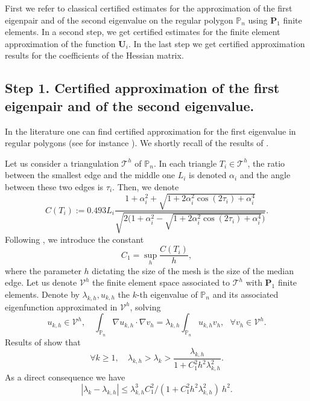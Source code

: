 \documentclass[JEP,XML,SOM,Unicode,ThmDefs,NoFloatCountersInSection,published]{cedram}
\theoremstyle{plain}
\theoremstyle{definition}
\newcommand{\bo}[1]{{\boldsymbol#1}}
\def\Pp{{\mathbb{P}_n}}
\newcommand{\lb}{\lambda}
\begin{document}
First we refer to classical certified estimates for the approximation of the first eigenpair and of the second eigenvalue on the regular polygon $\Pp$ using $\bo P_1$ finite elements. In a second step, we get certified estimates for the finite element approximation of the function $\bo U_i$. In the last step we get certified approximation results for the coefficients of the Hessian matrix.

\subsection{Step 1. Certified approximation of the first eigenpair and of the second eigenvalue.}
\label{sec:eig-estimates}

In the literature one can find certified approximation for the first eigenvalue in regular polygons (see for instance \cite{Jo17}). We shortly recall of the results of \cite[Th.\,4.3]{LiOi13}.

Let us consider a triangulation ${\mathcal T}^h$ of $\Pp$. In each triangle $T_i\in {\mathcal T}^h$, the ratio between the smallest edge and the middle one $L_i$ is denoted $\alpha_i$ and the angle between these two edges is $\tau_i$. Then, we denote
\[
C(T_i):= 0.493 L_i\frac{1+ \alpha_i^2+\sqrt{1+2 \alpha_i^2 \cos(2\tau_i) + \alpha_i^4}}{\sqrt{2\Big (1+ \alpha_i^2-\sqrt{1+2 \alpha_i^2 \cos(2\tau_i) + \alpha_i^4}\Big)}}.
\]
Following \cite[\S 2]{LiOi13}, we introduce the constant
\begin{equation}\label{eq:C1}
C_1= \sup_h \frac{C(T_i)}{h},
\end{equation}
where the parameter $h$ dictating the size of the mesh is the size of the median edge.
Let us denote $\mathcal V^h$ the finite element space associated to ${\mathcal T}^h$ with $\bo P_1$ finite elements. Denote by $\lb_{k,h}, u_{k,h}$ the $k$-th eigenvalue of $\Pp$ and its associated eigenfunction approximated in $\mathcal V^h$, solving
\begin{equation}
u_{k,h} \in \mathcal V^h,\quad \int_\Pp \nabla u_{k,h}\cdot \nabla v_h = \lambda_{k,h}\int_\Pp u_{k,h} v_h, \ \ \ \forall v_h \in \mathcal V^h.
\label{eq:eigenvalue-finite-elements}
\end{equation}
Results of \cite{LiOi13} show that
\[
\forall k \ge 1, \quad \lb_{k,h} > \lb_k> \frac{\lb_{k,h}}{1+ C_1^2 h^2 \lb_{k,h}^2}.
\]
As a direct consequence we have
\begin{equation}
|\lambda_k-\lambda_{k,h}| \leq \lambda_{k,h}^3 C_1^2/(1+C_1^2h^2\lambda_{k,h}^2)\ h^2.
\label{eq:difflam}
\end{equation}
\end{document}
